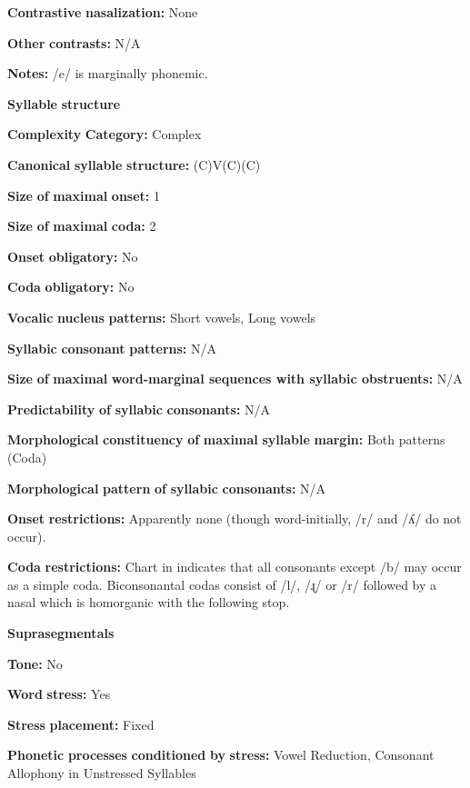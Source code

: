 \begin{styleBody}
\textbf{Contrastive} \textbf{nasalization:} None

\textbf{Other} \textbf{contrasts:} N/A

\textbf{Notes:} /e/ is marginally phonemic.

\textbf{Syllable} \textbf{structure}

\textbf{Complexity} \textbf{Category:} Complex

\textbf{Canonical} \textbf{syllable} \textbf{structure:} (C)V(C)(C) \citep[94-104]{Bowern2012}

\textbf{Size} \textbf{of} \textbf{maximal} \textbf{onset:} 1

\textbf{Size} \textbf{of} \textbf{maximal} \textbf{coda:} 2

\textbf{Onset} \textbf{obligatory:} No

\textbf{Coda} \textbf{obligatory:} No

\textbf{Vocalic} \textbf{nucleus} \textbf{patterns:} Short vowels, Long vowels

\textbf{Syllabic} \textbf{consonant} \textbf{patterns:} N/A

\textbf{Size} \textbf{of} \textbf{maximal} \textbf{word{}-marginal sequences with syllabic obstruents:} N/A

\textbf{Predictability} \textbf{of} \textbf{syllabic} \textbf{consonants:} N/A

\textbf{Morphological} \textbf{constituency} \textbf{of} \textbf{maximal} \textbf{syllable} \textbf{margin:} Both patterns (Coda)

\textbf{Morphological} \textbf{pattern} \textbf{of} \textbf{syllabic} \textbf{consonants:} N/A

\textbf{Onset} \textbf{restrictions:} Apparently none (though word-initially, /r/ and /ʎ/ do not occur).

\textbf{Coda} \textbf{restrictions:} Chart in \citet[102]{Bowern2012} indicates that all consonants except /b/ may occur as a simple coda. Biconsonantal codas consist of /l/, /ɻ/ or /r/ followed by a nasal which is homorganic with the following stop.

\textbf{Suprasegmentals}

\textbf{Tone:} No

\textbf{Word} \textbf{stress:} Yes

\textbf{Stress} \textbf{placement:} Fixed

\textbf{Phonetic} \textbf{processes} \textbf{conditioned} \textbf{by} \textbf{stress:} Vowel Reduction, Consonant Allophony in Unstressed Syllables


\end{styleBody}
